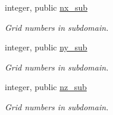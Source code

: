 \begin{DoxyCompactItemize}
\item 
integer, public \mbox{\hyperlink{namespacemodule__mpi__subdomain_ac0a0da3865fce334d01c602c949a680f}{nx\+\_\+sub}}
\begin{DoxyCompactList}\small\item\em Grid numbers in subdomain. \end{DoxyCompactList}\item 
integer, public \mbox{\hyperlink{namespacemodule__mpi__subdomain_a337008dffc01586ae3a149d255115e30}{ny\+\_\+sub}}
\begin{DoxyCompactList}\small\item\em Grid numbers in subdomain. \end{DoxyCompactList}\item 
integer, public \mbox{\hyperlink{namespacemodule__mpi__subdomain_a6df401547925214a36e4aaf656380a48}{nz\+\_\+sub}}
\begin{DoxyCompactList}\small\item\em Grid numbers in subdomain. \end{DoxyCompactList}\end{DoxyCompactItemize}

